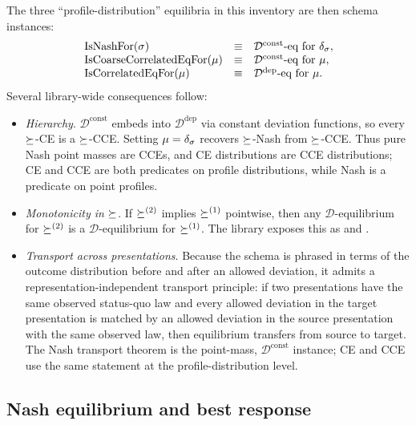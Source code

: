 The three ``profile-distribution'' equilibria in this inventory are
then schema instances:
\[
  \begin{array}{lcl}
    \mathrm{IsNashFor}(\sigma)
      &\equiv& \mathcal{D}^{\mathrm{const}}\text{-eq for } \delta_{\sigma}, \\
    \mathrm{IsCoarseCorrelatedEqFor}(\mu)
      &\equiv& \mathcal{D}^{\mathrm{const}}\text{-eq for } \mu, \\
    \mathrm{IsCorrelatedEqFor}(\mu)
      &\equiv& \mathcal{D}^{\mathrm{dep}}\text{-eq for } \mu.
  \end{array}
\]
Several library-wide consequences follow:
\begin{itemize}
\item \emph{Hierarchy}.  $\mathcal{D}^{\mathrm{const}}$ embeds into
$\mathcal{D}^{\mathrm{dep}}$ via constant deviation functions, so
every $\succeq$-CE is a $\succeq$-CCE\@.  Setting $\mu = \delta_{\sigma}$
recovers $\succeq$-Nash from $\succeq$-CCE\@.  Thus pure Nash point masses
are CCEs, and CE distributions are CCE distributions; CE and CCE are
both predicates on profile distributions, while Nash is a predicate
on point profiles.
\item \emph{Monotonicity in $\succeq$}.  If $\succeq^{(2)}$ implies
$\succeq^{(1)}$ pointwise, then any $\mathcal{D}$-equilibrium for
$\succeq^{(2)}$ is a $\mathcal{D}$-equilibrium for $\succeq^{(1)}$.
The library exposes this as
 and .
\item \emph{Transport across presentations}.  Because the schema is
phrased in terms of the outcome distribution before and after an
allowed deviation, it admits a representation-independent transport
principle: if two presentations have the same observed status-quo
law and every allowed deviation in the target presentation is
matched by an allowed deviation in the source presentation with the
same observed law, then equilibrium transfers from source to target.
The Nash transport theorem is the point-mass,
$\mathcal{D}^{\mathrm{const}}$ instance; CE and CCE use the same
statement at the profile-distribution level.
\end{itemize}


\subsection{Nash equilibrium and best response}
\label{sec:solution-concepts:nash}

